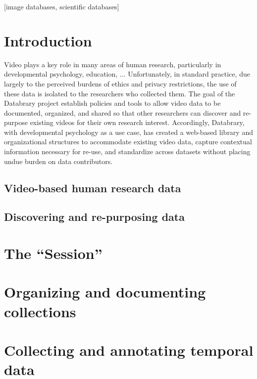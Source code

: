 \documentclass{sig-alternate}
\begin{document}
[image
databases, scientific databases]



\section{Introduction}

Video plays a key role in many areas of human research, particularly in developmental psychology, education, ...
Unfortunately, in standard practice, due largely to the perceived burdens of ethics and privacy restrictions, the use of these data is isolated to the researchers who collected them.
The goal of the Databrary project establish policies and tools to allow video data to be documented, organized, and shared so that other researchers can discover and re-purpose existing videos for their own research interest.
Accordingly, Databrary, with developmental psychology as a use case, has created a web-based library and organizational structures to accommodate existing video data, capture contextual information necessary for re-use, and standardize across datasets without placing undue burden on data contributors.

\subsection{Video-based human research data}

\subsection{Discovering and re-purposing data}

\section{The ``Session''}

\section{Organizing and documenting collections}

\section{Collecting and annotating temporal data}
\end{document}
